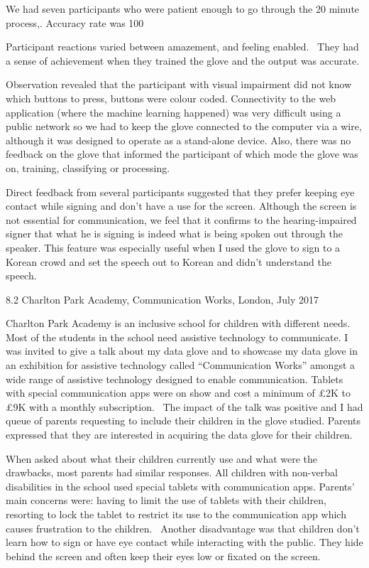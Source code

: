 We had seven participants who were patient enough to go through the 20 minute process,. Accuracy rate was 100%

Participant reactions varied between amazement, and feeling enabled.  They had a sense of achievement when they trained the glove and the output was accurate. 

Observation revealed that the participant with visual impairment did not know which buttons to press, buttons were colour coded. Connectivity to the web application (where the machine learning happened) was very difficult using a public network so we had to keep the glove connected to the computer via a wire, although it was designed to operate as a stand-alone device. Also, there was no feedback on the glove that informed the participant of which mode the glove was on, training, classifying or processing.

Direct feedback from several participants suggested that they prefer keeping eye contact while signing and don’t have a use for the screen. Although the screen is not essential for communication, we feel that it confirms to the hearing-impaired signer that what he is signing is indeed what is being spoken out through the speaker. This feature was especially useful when I used the glove to sign to a Korean crowd and set the speech out to Korean and didn’t understand the speech. 

8.2 Charlton Park Academy, Communication Works, London, July 2017

Charlton Park Academy is an inclusive school for children with different needs. Most of the students in the school need assistive technology to communicate. I was invited to give a talk about my data glove and to showcase my data glove in an exhibition for assistive technology called “Communication Works” amongst a wide range of assistive technology designed to enable communication. Tablets with special communication apps were on show and cost a minimum of £2K to £9K with a monthly subscription.  The impact of the talk was positive and I had queue of parents requesting to include their children in the glove studied. Parents expressed that they are interested in acquiring the data glove for their children. 

When asked about what their children currently use and what were the drawbacks, most parents had similar responses.  All children with non-verbal disabilities in the school used special tablets with communication apps. Parents’ main concerns were: having to limit the use of tablets with their children, resorting to lock the tablet to restrict its use to the communication app which causes frustration to the children.  Another disadvantage was that children don’t learn how to sign or have eye contact while interacting with the public. They hide behind the screen and often keep their eyes low or fixated on the screen. 


